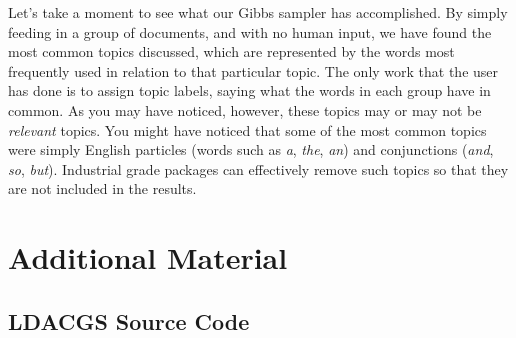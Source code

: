 Let's take a moment to see what our Gibbs sampler has accomplished.
By simply feeding in a group of documents, and with no human input, we have found the most common topics discussed, which are represented by the words most frequently used in relation to that particular topic.
The only work that the user has done is to assign topic labels, saying what the words in each group have in common.
As you may have noticed, however, these topics may or may not be \emph{relevant} topics.
You might have noticed that some of the most common topics were simply English particles (words such as \emph{a}, \emph{the}, \emph{an}) and conjunctions (\emph{and}, \emph{so}, \emph{but}).
Industrial grade packages can effectively remove such topics so that they are not included in the results.

\newpage

\section*{Additional Material} %

\subsection*{LDACGS Source Code} %

